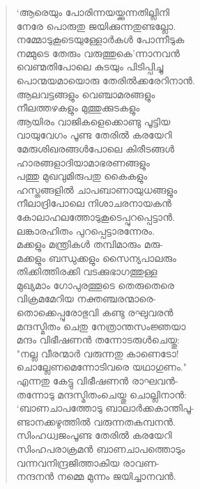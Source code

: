 \begin{verse}
‘ആരെയും പോരിന്നയയ്ക്കുന്നതില്ലിനി\\
നേരേ പൊരുതു ജയിക്കുന്നതുണ്ടല്ലോ.\\
നമ്മോടുകൂടെയുള്ളോര്‍കള്‍ പോന്നീടുക\\
നമ്മുടെ തേരും വരുത്തുകെ’ന്നാനവന്‍\\
വെണ്മതിപോലെ കുടയും പിടിപ്പിച്ചു\\
പൊന്മയമായൊരു തേരില്‍ക്കരേറിനാന്‍.\\
ആലവട്ടങ്ങളും വെഞ്ചാമരങ്ങളും\\
നീലത്തഴകളും മുത്തുക്കുടകളും\\
ആയിരം വാജികളെക്കൊണ്ടു പൂട്ടിയ\\
വായുവേഗം പൂണ്ട തേരില്‍ കരയേറി\\
മേരുശിഖരങ്ങള്‍പോലെ കിരീടങ്ങള്‍\\
ഹാരങ്ങളാദിയാമാഭരണങ്ങളും\\
പത്തു മുഖവുമിരുപതു കൈകളും\\
ഹസ്തങ്ങളില്‍ ചാപബാണായുധങ്ങളും\\
നീലാദ്രിപോലെ നിശാചരനായകന്‍\\
കോലാഹലത്തോടുകൂടെപ്പുറപ്പെട്ടാന്‍.\\
ലങ്കാരഹിതം പുറപ്പെട്ടാരന്നേരം.\\
മക്കളും മന്ത്രികള്‍ തമ്പിമാരും മരു-\\
മക്കളും ബന്ധുക്കളും സൈന്യപാലരും\\
തിക്കിത്തിരക്കി വടക്കുഭാഗത്തുള്ള\\
മുഖ്യമാം ഗോപുരത്തൂടെ തെരുതെരെ\\
വിക്രമമേറിയ നക്തഞ്ചരന്മാരെ-\\
തൊക്കെപ്പുരോഭുവി കണ്ടു രഘുവരന്‍\\
മന്ദസ്മിതം ചെതു നേത്രാന്തസംജ്ഞയാ\\
മന്ദം വിഭീഷണന്‍ തന്നോടരുള്‍ചെയ്തു:\\
"നല്ല വീരന്മാര്‍ വരുന്നതു കാണെടോ!\\
ചൊല്ലേണമെന്നോടിവരെ യഥാഗുണം."\\
എന്നതു കേട്ടു വിഭീഷണന്‍ രാഘവന്‍-\\
തന്നോടു മന്ദസ്മിതംചെയ്തു ചൊല്ലിനാന്‍:\\
‘ബാണചാപത്തോടു ബാലാര്‍ക്കകാന്തിപൂ-\\
ണ്ടാനക്കഴുത്തില്‍ വരുന്നതകമ്പനന്‍.\\
സിംഹധ്വജംപൂണ്ട തേരില്‍ കരയേറി\\
സിംഹപരാക്രമന്‍ ബാണചാപത്തൊടും\\
വന്നവനിന്ദ്രജിത്താകിയ രാവണ-\\
നന്ദനന്‍ നമ്മെ മുന്നം ജയിച്ചാനവന്‍.\\

\end{verse}
